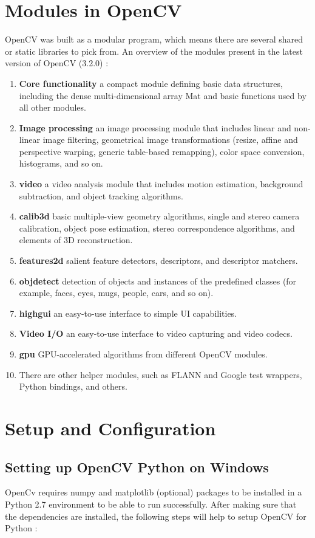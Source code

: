 \documentclass[9pt,twocolumn,twoside]{../../styles/osajnl}
\begin{document}
\section{Modules in OpenCV}
OpenCV was built as a modular program, which means there are several shared or static libraries to pick from. An overview of the modules present in the latest version of OpenCV (3.2.0) \cite{www-opencv-intro}:
\begin{enumerate}
    \item \textbf{Core functionality} a compact module defining basic data structures, including the dense multi-dimensional array Mat and basic functions used by all other modules.
    \item \textbf{Image processing} an image processing module that includes linear and non-linear image filtering, geometrical image transformations (resize, affine and perspective warping, generic table-based remapping), color space conversion, histograms, and so on.
    \item \textbf{video} a video analysis module that includes motion estimation, background subtraction, and object tracking algorithms.
    \item \textbf{calib3d} basic multiple-view geometry algorithms, single and stereo camera calibration, object pose estimation, stereo correspondence algorithms, and elements of 3D reconstruction.
    \item \textbf{features2d} salient feature detectors, descriptors, and descriptor matchers.
    \item \textbf{objdetect} detection of objects and instances of the predefined classes (for example, faces, eyes, mugs, people, cars, and so on).
    \item \textbf{highgui} an easy-to-use interface to simple UI capabilities.
    \item \textbf{Video I/O} an easy-to-use interface to video capturing and video codecs.
    \item \textbf{gpu} GPU-accelerated algorithms from different OpenCV modules.
    \item  There are other helper modules, such as FLANN and Google test wrappers, Python bindings, and others.
\end{enumerate}


\section{Setup and Configuration}
\subsection{Setting up OpenCV Python on Windows}
OpenCv requires numpy and matplotlib (optional) packages to be installed in a Python 2.7 environment to be able to run successfully. After making sure that the dependencies are installed, the following steps will help to setup OpenCV for Python \cite{www-opencv-python}:
\end{document}
